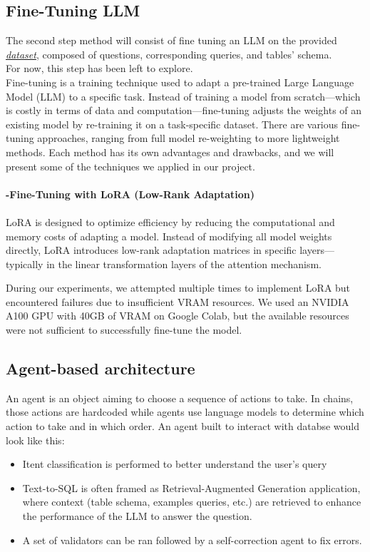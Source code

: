 \documentclass[12pt,a4paper]{article}
\begin{document}
\subsection*{Fine-Tuning LLM}
The second step method will consist of fine tuning an LLM on the provided \textit{\href{https://huggingface.co/datasets/richardr1126/spider-schema/viewer?row=1}{dataset}}, composed of questions, corresponding queries, and tables' schema.
\\
For now, this step has been left to explore.
\\
Fine-tuning is a training technique used to adapt a pre-trained Large Language Model (LLM) to a specific task. Instead of training a model from scratch—which is costly in terms of data and computation—fine-tuning adjusts the weights of an existing model by re-training it on a task-specific dataset. There are various fine-tuning approaches, ranging from full model re-weighting to more lightweight methods. Each method has its own advantages and drawbacks, and we will present some of the techniques we applied in our project.\\
\\
\textbf{-Fine-Tuning with LoRA (Low-Rank Adaptation)}\\
\\
LoRA is designed to optimize efficiency by reducing the computational and memory costs of adapting a model. Instead of modifying all model weights directly, LoRA introduces low-rank adaptation matrices in specific layers—typically in the linear transformation layers of the attention mechanism.

During our experiments, we attempted multiple times to implement LoRA but encountered failures due to insufficient VRAM resources. We used an NVIDIA A100 GPU with 40GB of VRAM on Google Colab, but the available resources were not sufficient to successfully fine-tune the model.


\subsection*{Agent-based architecture}

An agent is an object aiming to choose a sequence of actions to take. In chains, those actions are hardcoded while agents use language models to determine which action to take and in which order. An agent built to interact with databse would look like this:

\begin{itemize}
    \item Itent classification is performed to better understand the user's query
    \item Text-to-SQL is often framed as Retrieval-Augmented Generation application, where context (table schema, examples queries, etc.) are retrieved to enhance the performance of the LLM to answer the question. 
    \item A set of validators can be ran followed by a self-correction agent to fix errors.
\end{itemize}
\end{document}
